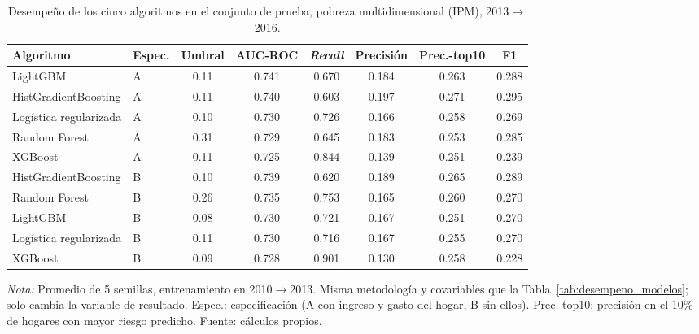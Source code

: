 \begin{table}[H]
  \centering
  \caption{Desempeño de los cinco algoritmos en el conjunto de prueba,
  pobreza multidimensional (IPM), 2013$\to$2016.}
  \label{tab:desempeno_modelos_ipm}
  \footnotesize
  \setlength{\tabcolsep}{4pt}
  \begin{tabular}{llcccccc}
    \toprule
    \textbf{Algoritmo} & \textbf{Espec.} & \textbf{Umbral} & \textbf{AUC-ROC} & \textbf{\emph{Recall}} & \textbf{Precisión} & \textbf{Prec.-top10} & \textbf{F1} \\
    \midrule
    LightGBM                 & A & 0.11 & 0.741 & 0.670 & 0.184 & 0.263 & 0.288 \\
    HistGradientBoosting     & A & 0.11 & 0.740 & 0.603 & 0.197 & 0.271 & 0.295 \\
    Logística regularizada   & A & 0.10 & 0.730 & 0.726 & 0.166 & 0.258 & 0.269 \\
    Random Forest            & A & 0.31 & 0.729 & 0.645 & 0.183 & 0.253 & 0.285 \\
    XGBoost                  & A & 0.11 & 0.725 & 0.844 & 0.139 & 0.251 & 0.239 \\
    \addlinespace
    HistGradientBoosting     & B & 0.10 & 0.739 & 0.620 & 0.189 & 0.265 & 0.289 \\
    Random Forest            & B & 0.26 & 0.735 & 0.753 & 0.165 & 0.260 & 0.270 \\
    LightGBM                 & B & 0.08 & 0.730 & 0.721 & 0.167 & 0.251 & 0.270 \\
    Logística regularizada   & B & 0.11 & 0.730 & 0.716 & 0.167 & 0.255 & 0.270 \\
    XGBoost                  & B & 0.09 & 0.728 & 0.901 & 0.130 & 0.258 & 0.228 \\
    \bottomrule
  \end{tabular}
  \begin{minipage}{0.95\textwidth}
    \vspace{4pt}
    \footnotesize \textit{Nota:} Promedio de 5 semillas, entrenamiento en
    2010$\to$2013. Misma metodología y covariables que la
    Tabla~\ref{tab:desempeno_modelos}; solo cambia la variable de
    resultado. Espec.: especificación (A con ingreso y gasto del hogar,
    B sin ellos). Prec.-top10: precisión en el 10\% de hogares con mayor
    riesgo predicho. Fuente: cálculos propios.
  \end{minipage}
\end{table}
